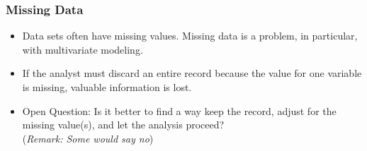 \documentclass{beamer}
\begin{document}
\begin{frame}
\large
	\frametitle{Missing Data}
	\begin{itemize}
		\item Data sets often have missing values.  Missing data is a problem, in particular, with multivariate modeling.  
		\item If the analyst must discard an entire record because the value for one variable is missing, valuable information is lost. \item Open Question: Is it better to find a way keep the record, adjust for the missing value(s), and let the analysis proceed? \\ (\textit{Remark: Some would say no})
	\end{itemize}
	
\end{frame}


%



% 

\end{document}
